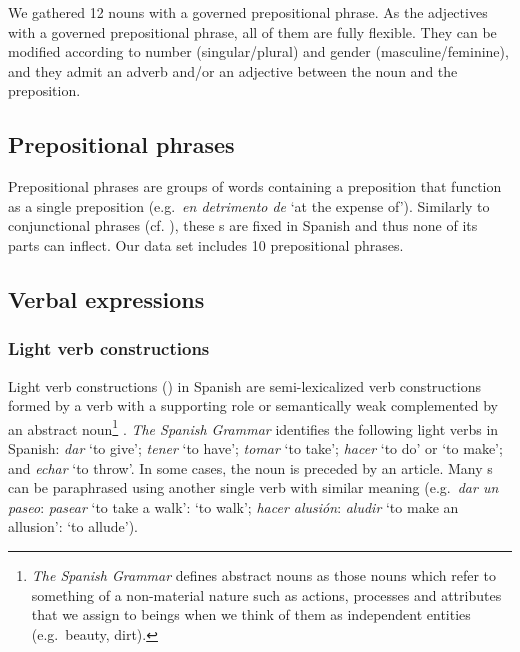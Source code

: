 \documentclass[output=paper]{langsci/langscibook}
\begin{document}
We gathered 12 nouns with a governed prepositional phrase.
As the adjectives with a governed prepositional phrase, all of them are fully flexible.
They can be modified according to number (singular/plural) and gender (masculine/feminine), and they admit an adverb and/or an adjective between the noun and the preposition.

\subsection{Prepositional phrases}
\label{sssec:prepositionalPhrases}
Prepositional phrases are groups of words containing a preposition that function as a single preposition (e.g.\ \textit{en detrimento de} `at the expense of'). 
Similarly to conjunctional phrases (cf. ), these \mwe s are fixed in Spanish and thus none of its parts can inflect.
Our data set includes 10 prepositional phrases.

\subsection{Verbal expressions}
\label{sssec:verbalExpressions}

\subsubsection{Light verb constructions}
\label{ssssec:lightVerbs}

Light verb constructions (\lvc) in Spanish are semi-lexicalized verb constructions formed by a verb with a supporting role or semantically weak complemented by an abstract noun\footnote{\textit{The Spanish Grammar} \citeyearpar[210]{RAE:2010} defines abstract nouns as those nouns which refer to something of a non-material nature such as actions, processes and attributes that we assign to beings when we think of them as independent entities (e.g.\ beauty, dirt).} \citep[14]{RAE:2010}.
\textit{The Spanish Grammar} \citep[14]{RAE:2010} identifies the following light verbs in Spanish: 
\textit{dar} `to give'; 
\textit{tener} `to have'; 
\textit{tomar} `to take'; 
\textit{hacer} `to do' or `to make'; and 
\textit{echar} `to throw'. 
In some cases, the noun is preceded by an article.
Many \lvc s can be paraphrased using another single verb with similar meaning (e.g.\ \textit{dar un paseo}: \textit{pasear} `to take a walk': `to walk'; \textit{hacer alusión}: \textit{aludir} `to make an allusion': `to allude').
\end{document}
